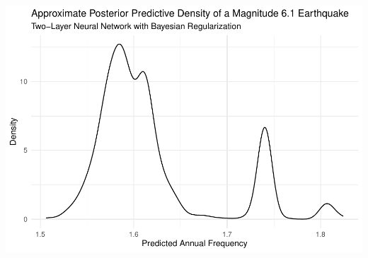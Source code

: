 \documentclass[
]{article}
\begin{document}
\includegraphics{Appendix_eq_files/figure-latex/unnamed-chunk-17-1.pdf}
\end{document}
